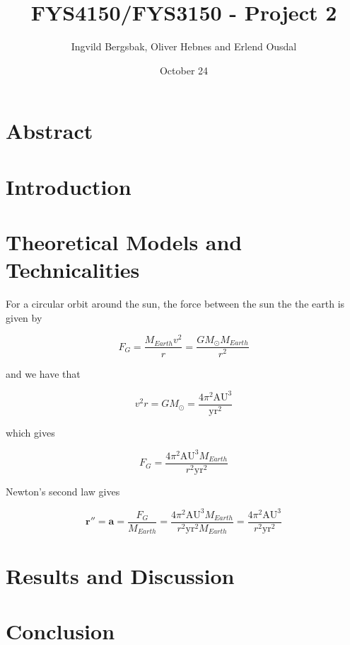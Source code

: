 \documentclass{article}
\title{\textbf{FYS4150/FYS3150 - Project 2}}
\author{Ingvild Bergsbak, Oliver Hebnes and Erlend Ousdal}
\date{October 24}
\begin{document}
\maketitle

\section{Abstract}

\section{Introduction}

\section{Theoretical Models and Technicalities}

For a circular orbit around the sun, the force between the sun the the earth is given by

$$F_G=\frac{M_{Earth}v^2}{r}=\frac{GM_{\odot}M_{Earth}}{r^2}$$

and we have that

$$v^2r=GM_{\odot}=\frac{4\pi^2\mathrm{AU}^3}{\mathrm{yr}^2}$$

which gives

$$F_G=\frac{4\pi^2\mathrm{AU}^3M_{Earth}}{r^2\mathrm{yr}^2}$$

Newton's second law gives

$$\mathbf{r}''=\mathbf{a}=\frac{F_G}{M_{Earth}}=\frac{4\pi^2\mathrm{AU}^3M_{Earth}}{r^2\mathrm{yr}^2M_{Earth}}=\frac{4\pi^2\mathrm{AU}^3}{r^2\mathrm{yr}^2}$$


\section{Results and Discussion}

\section{Conclusion}
\end{document}
